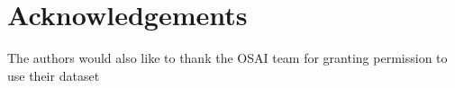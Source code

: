 \documentclass[journal]{IEEEtai}
\begin{document}










\section*{Acknowledgements}
The authors would also like to thank the OSAI team for granting permission to use their dataset



\end{document}
